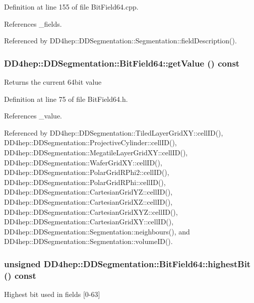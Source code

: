 Definition at line 155 of file BitField64.cpp.

References \_\-fields.

Referenced by DD4hep::DDSegmentation::Segmentation::fieldDescription().\hypertarget{class_d_d4hep_1_1_d_d_segmentation_1_1_bit_field64_a5a16525cfe7ce38157d40f1300f33934}{
\subsubsection[{getValue}]{ DD4hep::DDSegmentation::BitField64::getValue () const}}
\label{class_d_d4hep_1_1_d_d_segmentation_1_1_bit_field64_a5a16525cfe7ce38157d40f1300f33934}
Returns the current 64bit value 

Definition at line 75 of file BitField64.h.

References \_\-value.

Referenced by DD4hep::DDSegmentation::TiledLayerGridXY::cellID(), DD4hep::DDSegmentation::ProjectiveCylinder::cellID(), DD4hep::DDSegmentation::MegatileLayerGridXY::cellID(), DD4hep::DDSegmentation::WaferGridXY::cellID(), DD4hep::DDSegmentation::PolarGridRPhi2::cellID(), DD4hep::DDSegmentation::PolarGridRPhi::cellID(), DD4hep::DDSegmentation::CartesianGridYZ::cellID(), DD4hep::DDSegmentation::CartesianGridXZ::cellID(), DD4hep::DDSegmentation::CartesianGridXYZ::cellID(), DD4hep::DDSegmentation::CartesianGridXY::cellID(), DD4hep::DDSegmentation::Segmentation::neighbours(), and DD4hep::DDSegmentation::Segmentation::volumeID().\hypertarget{class_d_d4hep_1_1_d_d_segmentation_1_1_bit_field64_a6334ae7e469bd852eb9a96e597dd2e9e}{
\subsubsection[{highestBit}]{\setlength{\rightskip}{0pt plus 5cm}unsigned DD4hep::DDSegmentation::BitField64::highestBit () const}}
\label{class_d_d4hep_1_1_d_d_segmentation_1_1_bit_field64_a6334ae7e469bd852eb9a96e597dd2e9e}
Highest bit used in fields \mbox{[}0-\/63\mbox{]} 

